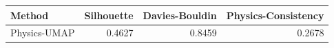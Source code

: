 \begin{tabular}{lrrr}
\toprule
Method & Silhouette & Davies-Bouldin & Physics-Consistency \\
\midrule
Physics-UMAP & 0.4627 & 0.8459 & 0.2678 \\
\bottomrule
\end{tabular}
